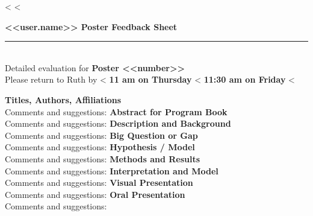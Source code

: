 \documentclass[12pt]{article}
\begin{document}
<%
<%

{\Large \bfseries <<user.name>> \hfill Poster Feedback Sheet}
\noindent\rule{\textwidth}{1pt} \\

\noindent Detailed evaluation for {\bfseries Poster <<number>>}\\
Please return to Ruth by
<%
{\bfseries 11 am on Thursday}
<%
{\bfseries 11:30 am on Friday}
<%
\vspace{.25in}

\begin{minipage}[t][.8\textheight]{.70\textwidth}

  {\bfseries Titles, Authors, Affiliations}\\
  Comments and suggestions:
  \vfill
  {\bfseries Abstract for Program Book}\\
  Comments and suggestions:
  \vfill
  {\bfseries Description and Background}\\
  Comments and suggestions:
  \vfill
  {\bfseries Big Question or Gap}\\
  Comments and suggestions:
  \vfill
  {\bfseries Hypothesis / Model}\\
  Comments and suggestions:
  \vfill
  {\bfseries Methods and Results}\\
  Comments and suggestions:
  \vfill
  {\bfseries Interpretation and Model}\\
  Comments and suggestions:
  \vfill
  {\bfseries Visual Presentation}\\
  Comments and suggestions:
  \vfill
  {\bfseries Oral Presentation}\\
  Comments and suggestions:
  \vfill


\end{minipage}%
\end{document}
